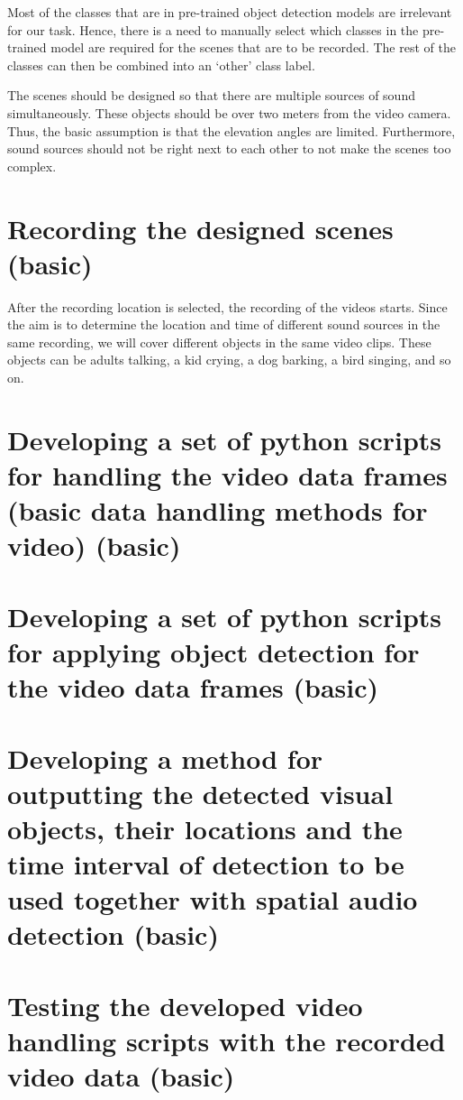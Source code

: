 Most of the classes that are in pre-trained object detection models are irrelevant for our task. Hence, there is a
need to manually select which classes in the pre-trained model are required for the scenes that are to be 
recorded. The rest of the classes can then be combined into an `other' class label.

The scenes should be designed so that there are multiple sources of sound simultaneously. These objects should
be over two meters from the video camera. Thus, the basic assumption is that the elevation angles are limited.
Furthermore, sound sources should not be right next to each other to not make the scenes too complex.

\section{Recording the designed scenes (basic)}
After the recording location is selected, the recording of the videos starts. Since the aim is to determine 
the location and time of different sound sources in the same recording, we will cover different objects in the 
same video clips. These objects can be adults talking, a kid crying, a dog barking, a bird singing, and so on.

\section{Developing a set of python scripts for handling the video data frames (basic data handling methods for video) (basic)}

\section{Developing a set of python scripts for applying object detection for the video data frames (basic)}

\section{Developing a method for outputting the detected visual objects, their locations and the time interval of detection to be used together with spatial audio detection (basic)}

\section{Testing the developed video handling scripts with the recorded video data (basic)}

